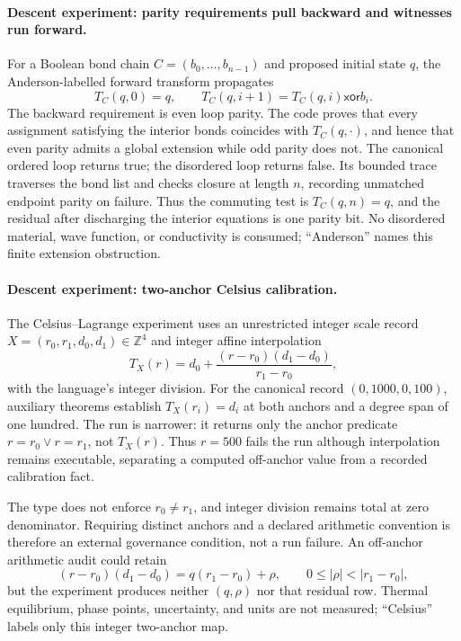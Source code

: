 \paragraph{Descent experiment: parity requirements pull backward and witnesses run forward.}
For a Boolean bond chain \(C=(b_0,\ldots,b_{n-1})\) and proposed initial state \(q\), the Anderson-labelled forward
transform propagates
\[
 T_C(q,0)=q,
 \qquad
 T_C(q,i+1)=T_C(q,i)\mathbin{\mathsf{xor}}b_i.
\]
The backward requirement is even loop parity.  The code proves that every assignment satisfying the interior bonds
coincides with \(T_C(q,\cdot)\), and hence that even parity admits a global extension while odd parity does not.  The
canonical ordered loop returns true; the disordered loop returns false.  Its bounded trace traverses the bond list and
checks closure at length \(n\), recording unmatched endpoint parity on failure.  Thus the commuting test is
\(T_C(q,n)=q\), and the residual after discharging the interior equations is one parity bit.  No disordered material,
wave function, or conductivity is consumed; ``Anderson'' names this finite extension obstruction.

\paragraph{Descent experiment: two-anchor Celsius calibration.}
The Celsius--Lagrange experiment uses an unrestricted integer scale record
\(X=(r_0,r_1,d_0,d_1)\in\mathbb Z^4\) and integer affine interpolation
\[
 T_X(r)=d_0+\frac{(r-r_0)(d_1-d_0)}{r_1-r_0},
\]
with the language's integer division.  For the canonical record \((0,1000,0,100)\), auxiliary theorems establish
\(T_X(r_i)=d_i\) at both anchors and a degree span of one hundred.  The run is narrower: it returns only the anchor
predicate \(r=r_0\lor r=r_1\), not \(T_X(r)\).  Thus \(r=500\) fails the run although interpolation remains
executable, separating a computed off-anchor value from a recorded calibration fact.

The type does not enforce \(r_0\ne r_1\), and integer division remains total at zero denominator.  Requiring distinct
anchors and a declared arithmetic convention is therefore an external governance condition, not a run failure.  An
off-anchor arithmetic audit could retain
\[
 (r-r_0)(d_1-d_0)
 =q(r_1-r_0)+\rho,
 \qquad 0\le |\rho|<|r_1-r_0|,
\]
but the experiment produces neither \((q,\rho)\) nor that residual row.  Thermal equilibrium, phase points,
uncertainty, and units are not measured; ``Celsius'' labels only this integer two-anchor map.

